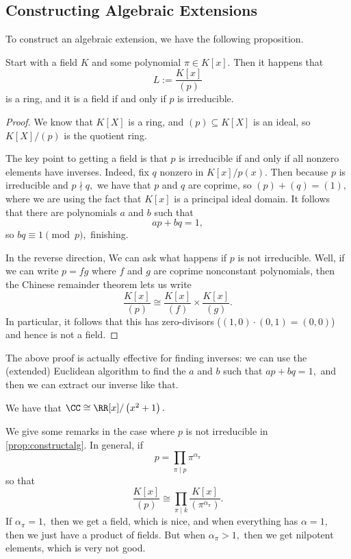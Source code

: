 \documentclass[../notes.tex]{subfiles}
\begin{document}
\subsection{Constructing Algebraic Extensions}
To construct an algebraic extension, we have the following proposition.
\begin{proposition} \label{prop:constructalg}
	Start with a field $K$ and some polynomial $\pi\in K[x].$ Then it happens that
	\[L:=\frac{K[x]}{(p)}\]
	is a ring, and it is a field if and only if $p$ is irreducible. 
\end{proposition}
\begin{proof}
	We know that $K[X]$ is a ring, and $(p)\subseteq K[X]$ is an ideal, so $K[X]/(p)$ is the quotient ring.
	
	The key point to getting a field is that $p$ is irreducible if and only if all nonzero elements have inverses. Indeed, fix $q$ nonzero in $K[x]/p(x).$ Then because $p$ is irreducible and $p\nmid q,$ we have that $p$ and $q$ are coprime, so $(p)+(q)=(1),$ where we are using the fact that $K[x]$ is a principal ideal domain. It follows that there are polynomials $a$ and $b$ such that
	\[ap+bq=1,\]
	so $bq\equiv1\pmod p,$ finishing.

	In the reverse direction, We can ask what happens if $p$ is not irreducible. Well, if we can write $p=fg$ where $f$ and $g$ are coprime nonconstant polynomials, then the Chinese remainder theorem lets us write
	\[\frac{K[x]}{(p)}\cong\frac{K[x]}{(f)}\times\frac{K[x]}{(g)}.\]
	In particular, it follows that this has zero-divisors ($(1,0)\cdot(0,1)=(0,0)$) and hence is not a field.
\end{proof}
\begin{remark}
	The above proof is actually effective for finding inverses: we can use the (extended) Euclidean algorithm to find the $a$ and $b$ such that $ap+bq=1,$ and then we can extract our inverse like that.
\end{remark}
\begin{example}
	We have that $\CC\cong\RR[x]/\left(x^2+1\right).$
\end{example}
We give some remarks in the case where $p$ is not irreducible in \autoref{prop:constructalg}. In general, if
\[p=\prod_{\pi\mid p}\pi^{\alpha_\pi}\]
so that
\[\frac{K[x]}{(p)}\cong\prod_{\pi\mid k}\frac{K[x]}{(\pi^{\alpha_\pi})}.\]
If $\alpha_\pi=1,$ then we get a field, which is nice, and when everything has $\alpha=1,$ then we just have a product of fields. But when $\alpha_\pi>1,$ then we get nilpotent elements, which is very not good.
\end{document}
